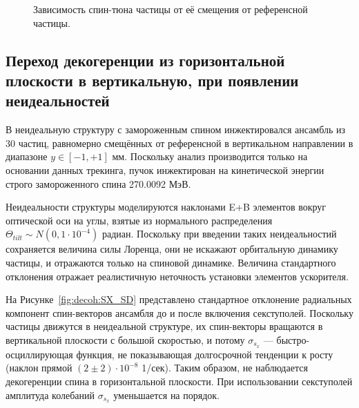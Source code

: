 \begin{figure}[!h]\centering
	\caption{Зависимость спин-тюна частицы от её смещения от референсной частицы.\label{fig:decoh:perfect}}
\end{figure}

\subsection{Переход декогеренции из горизонтальной плоскости в вертикальную, при появлении неидеальностей}
В неидеальную структуру с замороженным спином инжектировался ансамбль из 30 частиц, равномерно смещённых 
от референсной в вертикальном направлении в диапазоне $y \in [-1, +1]$ мм. Поскольку анализ производится только
на основании данных трекинга, пучок инжектирован на кинетической энергии строго замороженного спина
270.0092 МэВ.

Неидеальности структуры моделируются наклонами E+B элементов вокруг оптической оси на углы, 
взятые из нормального распределения $\Theta_{tilt} \sim N(0, 1\cdot 10^{-4})$ радиан. 
Поскольку при введении таких неидеальностий сохраняется величина силы Лоренца, они не искажают 
орбитальную динамику частицы, и отражаются только на спиновой динамике. Величина стандартного отклонения
отражает реалистичную неточность установки элементов ускорителя. 

На Рисунке~\ref{fig:decoh:SX_SD} представлено стандартное отклонение радиальных компонент спин-векторов ансамбля
до и после включения секступолей. Поскольку частицы движутся в неидеальной структуре, их спин-векторы вращаются
в вертикальной плоскости с большой скоростью, и потому $\sigma_{s_x}$ --- быстро-осциллирующая функция, не
показывающая долгосрочной тенденции к росту (наклон прямой $(2\pm2)\cdot 10^{-8}$ 1/сек). Таким образом, 
не наблюдается декогеренции спина в горизонтальной плоскости. При использовании секступолей 
амплитуда колебаний $\sigma_{s_x}$ уменьшается на порядок.

